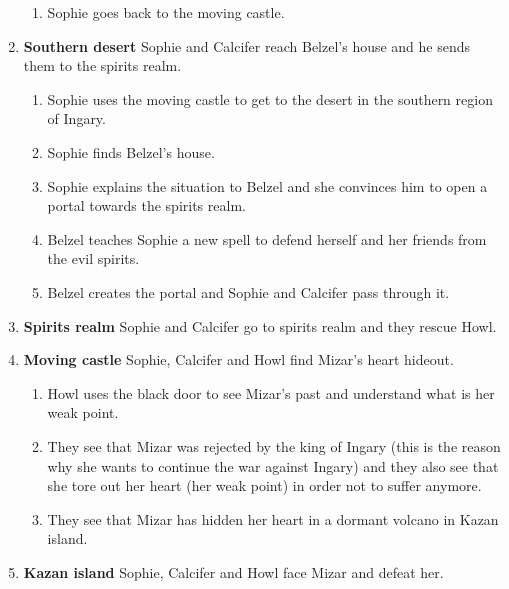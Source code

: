 \begin{enumerate}
\begin{enumerate}
    \item Sophie goes back to the moving castle.
  \end{enumerate}

\item \textbf{Southern desert} Sophie and Calcifer reach Belzel's house and he sends them to the spirits realm.

  \begin{enumerate}
  \item Sophie uses the moving castle to get to the desert in the southern region of Ingary.
    
  \item Sophie finds Belzel's house.
    
  \item Sophie explains the situation to Belzel and she convinces him to open a portal towards the spirits realm.
    
  \item Belzel teaches Sophie a new spell to defend herself and her friends from the evil spirits.
    
  \item Belzel creates the portal and Sophie and Calcifer pass through it.
  \end{enumerate}

\item \textbf{Spirits realm} Sophie and Calcifer go to spirits realm and they rescue Howl.

\item \textbf{Moving castle} Sophie, Calcifer and Howl find Mizar's heart hideout.

  \begin{enumerate}
  \item Howl uses the black door to see Mizar's past and understand what is her weak point.
    
  \item They see that Mizar was rejected by the king of Ingary (this is the reason why she wants to continue the war against Ingary) and they also see that she tore out her heart (her weak point) in order not to suffer anymore.
    
  \item They see that Mizar has hidden her heart in a dormant volcano in Kazan island.
  \end{enumerate}
    
\item \textbf{Kazan island} Sophie, Calcifer and Howl face Mizar and defeat her.


\end{enumerate}
